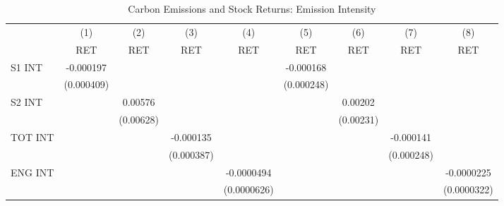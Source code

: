 \begin{table}[htbp]\centering
\def\sym#1{\ifmmode^{#1}\else\(^{#1}\)\fi}
\caption{Carbon Emissions and Stock Returns: Emission Intensity}
\begin{tabular}{l*{8}{c}}
\hline\hline
                    &\multicolumn{1}{c}{(1)}&\multicolumn{1}{c}{(2)}&\multicolumn{1}{c}{(3)}&\multicolumn{1}{c}{(4)}&\multicolumn{1}{c}{(5)}&\multicolumn{1}{c}{(6)}&\multicolumn{1}{c}{(7)}&\multicolumn{1}{c}{(8)}\\
                    &\multicolumn{1}{c}{RET}&\multicolumn{1}{c}{RET}&\multicolumn{1}{c}{RET}&\multicolumn{1}{c}{RET}&\multicolumn{1}{c}{RET}&\multicolumn{1}{c}{RET}&\multicolumn{1}{c}{RET}&\multicolumn{1}{c}{RET}\\
\hline
S1 INT              &   -0.000197         &                     &                     &                     &   -0.000168         &                     &                     &                     \\
                    &  (0.000409)         &                     &                     &                     &  (0.000248)         &                     &                     &                     \\
S2 INT              &                     &     0.00576         &                     &                     &                     &     0.00202         &                     &                     \\
                    &                     &   (0.00628)         &                     &                     &                     &   (0.00231)         &                     &                     \\
TOT INT             &                     &                     &   -0.000135         &                     &                     &                     &   -0.000141         &                     \\
                    &                     &                     &  (0.000387)         &                     &                     &                     &  (0.000248)         &                     \\
ENG INT             &                     &                     &                     &  -0.0000494         &                     &                     &                     &  -0.0000225         \\
                    &                     &                     &                     & (0.0000626)         &                     &                     &                     & (0.0000322)         \\

\end{tabular}
\end{table}
